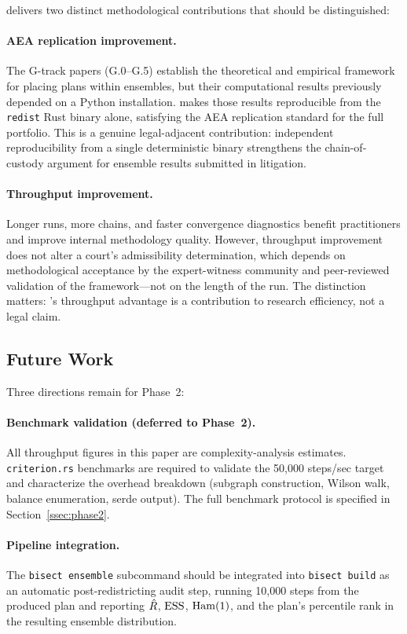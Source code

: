 \re{} delivers two distinct methodological contributions that should be
distinguished:

\paragraph{AEA replication improvement.}
The G-track papers (G.0--G.5) establish the theoretical and empirical
framework for placing \ar{} plans within \recom{} ensembles, but their
computational results previously depended on a Python \gc{} installation.
\re{} makes those results reproducible from the \texttt{redist} Rust
binary alone, satisfying the AEA replication standard for the full
portfolio.
This is a genuine legal-adjacent contribution: independent reproducibility
from a single deterministic binary strengthens the chain-of-custody argument
for ensemble results submitted in litigation.

\paragraph{Throughput improvement.}
Longer runs, more chains, and faster convergence diagnostics benefit
practitioners and improve internal methodology quality.
However, throughput improvement does not alter a court's admissibility
determination, which depends on methodological acceptance by the
expert-witness community and peer-reviewed validation of the \recom{}
framework---not on the length of the run.
The distinction matters: \re{}'s throughput advantage is a contribution
to research efficiency, not a legal claim.

\subsection{Future Work}

Three directions remain for Phase~2:

\paragraph{Benchmark validation (deferred to Phase~2).}
All throughput figures in this paper are complexity-analysis estimates.
\texttt{criterion.rs} benchmarks are required to validate the 50{,}000
steps/sec target and characterize the overhead breakdown (subgraph
construction, Wilson walk, balance enumeration, serde output).
The full benchmark protocol is specified in Section~\ref{ssec:phase2}.

\paragraph{Pipeline integration.}
The \texttt{bisect ensemble} subcommand should be integrated into
\texttt{bisect build} as an automatic post-redistricting audit step,
running 10{,}000 steps from the produced plan and reporting
$\hat{R}$, $\mathrm{ESS}$, $\mathrm{Ham}(1)$, and the plan's percentile rank in the
resulting ensemble distribution.


